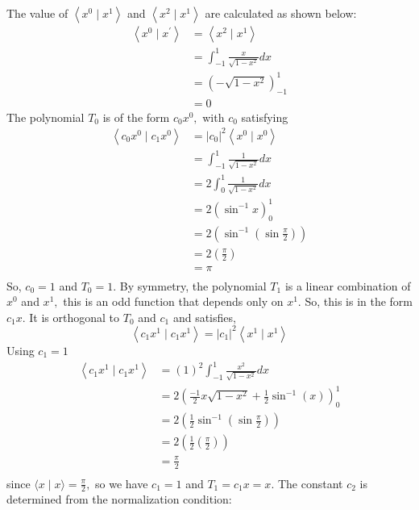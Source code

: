 The value of $\left\langle x^{0} \mid x^{1}\right\rangle$ and $\left\langle x^{2} \mid x^{1}\right\rangle$ are calculated as shown below:
$$
\begin{aligned}
\left\langle x^{0} \mid x^{\prime}\right\rangle &=\left\langle x^{2} \mid x^{1}\right\rangle \\
&=\int_{-1}^{1} \frac{x}{\sqrt{1-x^{2}}} d x \\
&=\left(-\sqrt{1-x^{2}}\right)_{-1}^{1} \\
&=0
\end{aligned}
$$
The polynomial $T_{0}$ is of the form $c_{0} x^{0},$ with $c_{0}$ satisfying
$$
\begin{aligned}
\left\langle c_{0} x^{0} \mid c_{1} x^{0}\right\rangle &=\left|c_{0}\right|^{2}\left\langle x^{0} \mid x^{0}\right\rangle \\
&=\int_{-1}^{1} \frac{1}{\sqrt{1-x^{2}}} d x \\
&=2 \int_{0}^{1} \frac{1}{\sqrt{1-x^{2}}} d x \\
&=2\left(\sin ^{-1} x\right)_{0}^{1}\\
&=2\left(\sin ^{-1}\left(\sin \frac{\pi}{2}\right)\right) \\
&=2\left(\frac{\pi}{2}\right) \\
&=\pi \\
\end{aligned}
$$
So, $c_{0}=1$ and $T_{0}=1$. By symmetry, the polynomial $T_{1}$ is a linear combination of $x^{0}$ and $x^{1},$ this is an odd function that
depends only on $x^{1} .$ So, this is in the form $c_{1} x$.
It is orthogonal to $T_{0}$ and $c_{1}$ and satisfies,
$$
\left\langle c_{1} x^{1} \mid c_{1} x^{1}\right\rangle=\left|c_{1}\right|^{2}\left\langle x^{1} \mid x^{1}\right\rangle
$$
Using $c_{1} = 1$
$$
\begin{aligned}
\left\langle c_{1} x^{1} \mid c_{1} x^{1}\right\rangle&=(1)^{2} \int_{-1}^{1} \frac{x^{2}}{\sqrt{1-x^{2}}} d x \\
&=2\left(\frac{-1}{2} x \sqrt{1-x^{2}}+\frac{1}{2} \sin ^{-1}(x)\right)_{0}^{1} \\
&=2\left(\frac{1}{2} \sin ^{-1}\left(\sin \frac{\pi}{2}\right)\right) \\
&=2\left(\frac{1}{2}\left(\frac{\pi}{2}\right)\right) \\
&=\frac{\pi}{2} \\
\end{aligned}
$$
since $\langle x \mid x\rangle=\frac{\pi}{2},$ so we have $c_{1}=1$ and $T_{1}=c_{1} x=x$. The constant $c_{2}$ is determined from the normalization condition:
